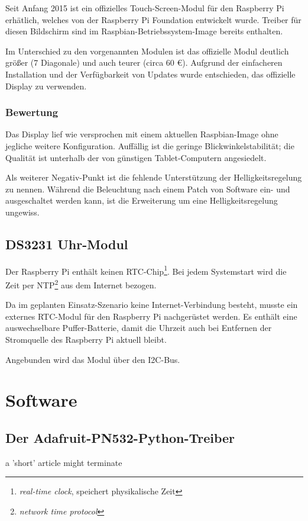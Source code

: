 \documentclass[11pt,a4paper]{IEEEtran} \usepackage[ngerman]{babel}
\begin{document}
Seit Anfang 2015 ist ein offizielles Touch-Screen-Modul für den Raspberry Pi
erhätlich, welches von der Raspberry Pi Foundation entwickelt wurde. Treiber
für diesen Bildschirm sind im Raspbian-Betriebssystem-Image bereits enthalten.

Im Unterschied zu den vorgenannten Modulen ist das offizielle Modul deutlich
größer (\SI{7}{\inch} Diagonale) und auch teurer (circa 60 \euro). Aufgrund der
einfacheren Installation und der Verfügbarkeit von Updates wurde entschieden,
das offizielle Display zu verwenden.

\subsubsection{Bewertung}

Das Display lief wie versprochen mit einem aktuellen Raspbian-Image ohne
jegliche weitere Konfiguration. Auffällig ist die geringe
Blickwinkelstabilität; die Qualität ist unterhalb der von günstigen
Tablet-Computern angesiedelt.

Als weiterer Negativ-Punkt ist die fehlende Unterstützung der
Helligkeitsregelung zu nennen. Während die Beleuchtung nach einem Patch von
Software ein- und ausgeschaltet werden kann, ist die Erweiterung um eine
Helligkeitsregelung ungewiss\autocite{TouchBacklight}.

\subsection{DS3231 Uhr-Modul}

Der Raspberry Pi enthält keinen RTC-Chip\footnote{\emph{real-time clock},
speichert physikalische Zeit}. Bei jedem Systemstart wird die Zeit per
NTP\footnote{\emph{network time protocol}} aus dem Internet bezogen.

Da im geplanten Einsatz-Szenario keine Internet-Verbindung besteht, musste ein
externes RTC-Modul für den Raspberry Pi nachgerüstet werden. Es enthält eine
auswechselbare Puffer-Batterie, damit die Uhrzeit auch bei Entfernen der
Stromquelle des Raspberry Pi aktuell bleibt. 


Angebunden wird das Modul über den I2C-Bus.

\section{Software} \label{sec:sw}

\subsection{Der Adafruit-PN532-Python-Treiber} %
a 'short' article might terminate
\end{document}
